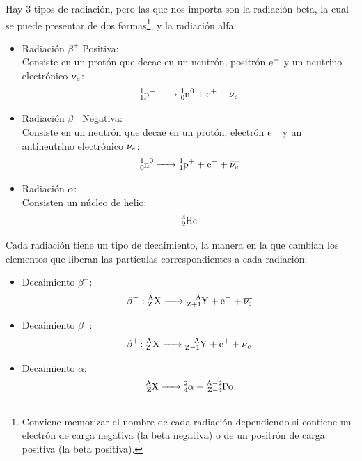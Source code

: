 \documentclass[arial,a4paper,print]{article}
\begin{document}
Hay 3 tipos de radiación, pero las que nos importa son la radiación beta, la cual se puede presentar de dos formas\footnote{Conviene memorizar el nombre de cada radiación dependiendo si contiene un electrón de carga negativa (la beta negativa) o de un positrón de carga positiva (la beta positiva).}, y la radiación alfa:
\begin{itemize}
	\item Radiación $\beta^{+}$ Positiva: \\
	Consiste en un protón que decae en un neutrón, positrón $\ce{e^+}$ y un neutrino electrónico $\ce{\nu_e}$:
	\begin{equation*}
		\ce{^{1}_{1}p^{+} -> ^{1}_{0}n^{0} + e^{+} + \nu_{e}}
	\end{equation*}

	\item Radiación $\beta^{-}$ Negativa: \\
	Consiste en un neutrón que decae en un protón, electrón $\ce{e^-}$ y un antineutrino electrónico $\ce{\nu_e}$:
	\begin{equation*}
		\ce{^{1}_{0}n^{0} -> ^{1}_{1}p^{+} + e^{-} + \overline{\nu_{e}}}
	\end{equation*}

	\item Radiación $\alpha$: \\
	Consisten un núcleo de helio:
	\begin{equation*}
		\ce{^{4}_{2}He}
	\end{equation*}
\end{itemize}

Cada radiación tiene un tipo de decaimiento, la manera en la que cambian los elementos que liberan las partículas correspondientes a cada radiación:
\begin{itemize}
	\item Decaimiento $\beta^{-}$: \\
	\begin{equation*}
		\ce{\beta^{-} \colon^A_ZX -> ^A_{Z+1}Y + e^{-} + \overline{\nu_{e}}}
	\end{equation*}
	
	\item Decaimiento $\beta^{+}$: \\
	\begin{equation*}
		\ce{\beta^{+}\colon ^A_ZX -> ^A_{Z-1}Y + e^{+} + \nu_{e}}
	\end{equation*}

	\item Decaimiento $\alpha$: \\
	\begin{equation*}
		\ce{^A_{Z}X -> ^2_4\alpha_ + ^{A-2}_{Z-4}Po}
	\end{equation*}
\end{itemize}
\end{document}

